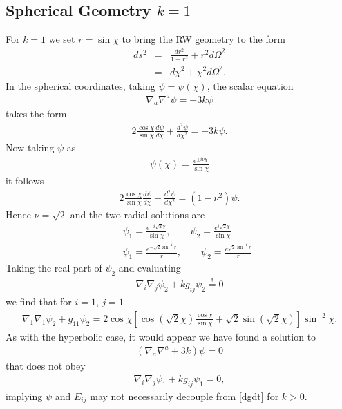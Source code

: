 \documentclass[10pt,letterpaper]{article}
\numberwithin{equation}{section}
\begin{document}
\subsection{Spherical Geometry $k=1$}
For $k=1$ we set $r =\sin\chi$ to bring the RW geometry to the form
\begin{eqnarray}
ds^2 &=& \frac{dr^2}{1-r^2}+r^2d\Omega^2
\nonumber\\
&=& d\chi^2 + \chi^2 d\Omega^2.
\end{eqnarray}
In the spherical coordinates, taking $\psi = \psi(\chi)$, the scalar equation
\begin{eqnarray}
\nabla_a \nabla^a \psi = -3k\psi
\end{eqnarray}
takes the form 
\begin{eqnarray}
2\frac{\cos\chi}{\sin\chi}\frac{d\psi}{d\chi} + \frac{d^2\psi}{d\chi^2} = -3k\psi.
\end{eqnarray}
Now taking $\psi$ as
\begin{eqnarray}
\psi(\chi) = \frac{e^{\pm i\nu\chi}}{\sin\chi}
\end{eqnarray}
it follows
\begin{eqnarray}
2\frac{\cos\chi}{\sin\chi}\frac{d\psi}{d\chi} + \frac{d^2\psi}{d\chi^2} = (1-\nu^2)\psi.
\end{eqnarray}
Hence $\nu = \sqrt{2}$ and the two radial solutions are
\begin{eqnarray}
&&\psi_1 = \frac{e^{-i\sqrt{2}\chi}}{\sin\chi},\qquad \psi_2 = \frac{e^{i \sqrt{2} \chi}}{\sin\chi}
\nonumber\\ 
&&\psi_1= \frac{e^{-\sqrt 2\sin^{-1}r}}{r},\qquad \psi_2= \frac{e^{\sqrt 2\sin^{-1}r}}{r}
\end{eqnarray}
Taking the real part of $\psi_2$ and evaluating
\begin{eqnarray}
\nabla_i\nabla_j \psi_2 + k g_{ij}\psi_2 \overset{!}{=}0
\end{eqnarray}
we find that for $i=1$, $j=1$
\begin{eqnarray}
\nabla_1\nabla_1 \psi_2 + g_{11}\psi_2 = 2\cos\chi\left[\cos(\sqrt 2\chi) \frac{\cos\chi}{\sin\chi}+\sqrt 2 \sin(\sqrt 2\chi)\right] \sin^{-2}\chi.
\end{eqnarray}
As with the hyperbolic case, it would appear we have found a solution to
\begin{eqnarray}
(\nabla_a\nabla^a +3k)\psi = 0
\end{eqnarray}
that does not obey
\begin{eqnarray}
\nabla_i\nabla_j \psi_1 + k g_{ij}\psi_1 =0,
\end{eqnarray}
implying $\psi$ and $E_{ij}$ may not necessarily decouple from \eqref{dgdt} for $k>0$. 
\newpage
\end{document}
